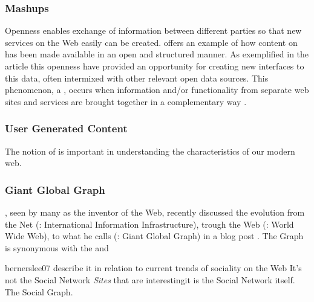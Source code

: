 \subsubsection{Mashups}
Openness enables exchange of information between
different parties so that new services on the Web easily can be created.
\citet{auer07} offers an example of how content on %
has been made available in an open and structured manner. As exemplified
in the article this openness have provided an opportunity for creating new
interfaces to this data, often intermixed with other relevant open
data sources. This phenomenon, a %
,
occurs when information and/or functionality from separate web sites and
services are brought together in a complementary way
\citep[p.~36]{murugesan07}.

\subsubsection{User Generated Content}
The notion of  is important in understanding
the characteristics of our modern web.
%
%
%
%

\subsubsection{Giant Global Graph}
\citeauthor{bernerslee07}, seen by many as the inventor of the Web,
recently discussed the evolution from the Net (: International
Information Infrastructure), trough the Web (: World Wide Web),
to what he calls  (: Giant Global Graph) in a
blog post \citeyearpar{bernerslee07}. The Graph is synonymous with the
%
and
\begin{fullquote}{bernerslee07}{%
  describe it in relation to current trends of sociality on the Web}
    It's not the Social Network \emph{Sites} that are interesting\dash{}it is
    the Social Network itself. The Social Graph.
\end{fullquote}


